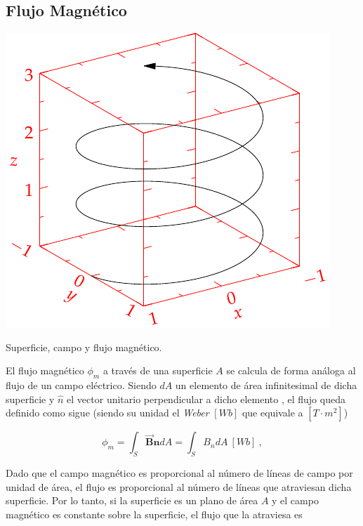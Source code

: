\documentclass{tufte-handout}
\begin{document}
\subsection{Flujo Magnético}

\begin{marginfigure}%
    \includegraphics[width=\linewidth]{helix}
    \caption{Superficie, campo y flujo magnético.}
    \label{fig:flujomagnetico}
\end{marginfigure}

El flujo magnético $\phi_m$ a través de una superficie $A$ se calcula de forma análoga al flujo de un campo eléctrico. Siendo $dA$ un elemento de área infinitesimal de dicha superficie y $\hat{n}$ el vector unitario perpendicular a dicho elemento , el flujo queda definido como sigue (siendo su unidad el \emph{Weber} $[Wb]$ que equivale a $[T\cdot m^2]$)

\begin{equation}
\phi_m = \int_{S} \mathbf{\vec{B}}\mathbf{\hat{n}}dA = \int_{S}B_ndA ~ [Wb]~, 
\end{equation}

Dado que el campo magnético es proporcional al número de líneas de campo por unidad de área, el flujo es proporcional al número de líneas que atraviesan dicha superficie. Por lo tanto, si la superficie es un plano de área $A$ y el campo magnético es constante sobre la superficie, el flujo que la atraviesa es
\end{document}
